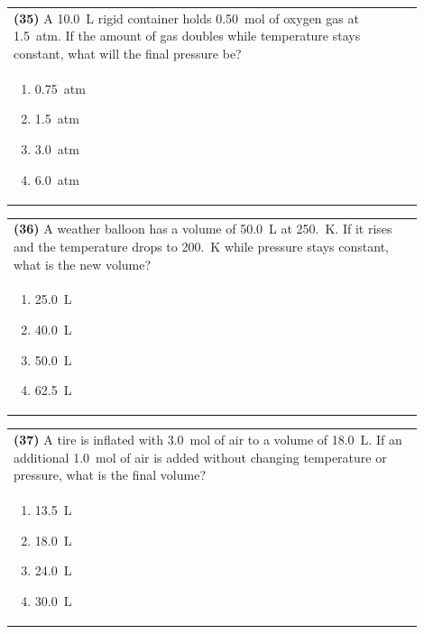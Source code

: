\documentclass{article}
\begin{document}
\vspace{0.2cm}
\noindent\begin{tabular}{|p{0.9\linewidth}|}
\hline
\textbf{(35)} A 10.0~L rigid container holds 0.50~mol of oxygen gas at 1.5~atm. If the amount of gas doubles while temperature stays constant, what will the final pressure be?\\[0.2cm]
\begin{minipage}[t]{0.85\linewidth}
\begin{enumerate}[label=\alph*.]
\item 0.75~atm
\item 1.5~atm
\item 3.0~atm
\item 6.0~atm
\end{enumerate}
\end{minipage}\\[0.2cm]
\hline
\end{tabular}

\vspace{0.2cm}
\noindent\begin{tabular}{|p{0.9\linewidth}|}
\hline
\textbf{(36)} A weather balloon has a volume of 50.0~L at 250.~K. If it rises and the temperature drops to 200.~K while pressure stays constant, what is the new volume?\\[0.2cm]
\begin{minipage}[t]{0.85\linewidth}
\begin{enumerate}[label=\alph*.]
\item 25.0~L
\item 40.0~L
\item 50.0~L
\item 62.5~L
\end{enumerate}
\end{minipage}\\[0.2cm]
\hline
\end{tabular}
\newpage

\vspace{0.2cm}
\noindent\begin{tabular}{|p{0.9\linewidth}|}
\hline
\textbf{(37)} A tire is inflated with 3.0~mol of air to a volume of 18.0~L. If an additional 1.0~mol of air is added without changing temperature or pressure, what is the final volume?\\[0.2cm]
\begin{minipage}[t]{0.85\linewidth}
\begin{enumerate}[label=\alph*.]
\item 13.5~L
\item 18.0~L
\item 24.0~L
\item 30.0~L
\end{enumerate}
\end{minipage}\\[0.2cm]
\hline
\end{tabular}
\end{document}

